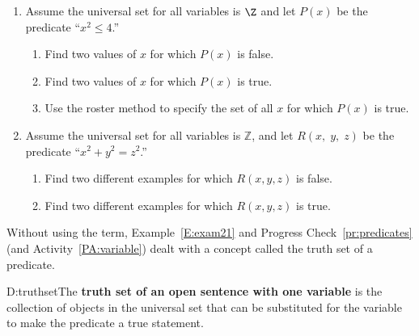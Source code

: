 \hbreak
%
\begin{prog}\label{pr:predicates} \hfill
\begin{enumerate}
  \item Assume the universal set for all variables is  $\Z$ and let  $P( x )$ be the predicate  ``$x^2  \leq 4$.'' 
  \begin{enumerate}
    \item Find two values of  $x$  for which  $P( x )$ is false.
    \item Find two values of  $x$  for which  $P( x )$ is true.
    \item Use the roster method to specify the set of all $x$  for which  $P( x )$ is true.
  \end{enumerate}

\item Assume the universal set for all variables is  $\mathbb{Z}$, and let  
$R( {x,\;y,\;z} )$ be the predicate  ``$x^2  + y^2  = z^2 $.'' 
  \begin{enumerate}
    \item Find two different examples for which  $R( {x, y, z})$ is false.
    \item Find two different examples for which  $R( {x, y, z})$ is true.
  \end{enumerate}

\end{enumerate}
\end{prog}
\hbreak
Without using the term, Example~\ref{E:exam21} and Progress Check~\ref{pr:predicates} (and \typeu Activity~\ref*{PA:variable}) dealt with a concept called the truth set of a predicate.  
%
\begin{defbox}{D:truthset}{The \textbf{truth set of an open sentence with one variable}
%
 is the collection of objects in the universal set that can be substituted for the variable to make the predicate a true statement.}
\end{defbox}
